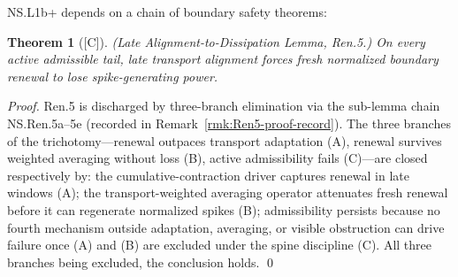 \documentclass[12pt,oneside]{amsbook}
\theoremstyle{plain}
\newtheorem{theorem}{Theorem}[section]
\theoremstyle{definition}
\theoremstyle{remark}
\newcommand{\status}[1]{\textup{[#1]}}
\begin{document}
NS.L1b+ depends on a chain of boundary safety theorems:

\begin{theorem}[\status{C}]\label{thm:NSRen5}
\textup{(Late Alignment-to-Dissipation Lemma, Ren.5.)}
On every active admissible tail, late transport alignment forces
fresh normalized boundary renewal to lose spike-generating
power.
\end{theorem}

\begin{proof}
Ren.5 is discharged by three-branch elimination via the
sub-lemma chain NS.Ren.5a--5e (recorded in
Remark~\ref{rmk:Ren5-proof-record}). The three branches of the
trichotomy---renewal outpaces transport adaptation (A), renewal
survives weighted averaging without loss (B), active admissibility
fails (C)---are closed respectively by: the cumulative-contraction
driver captures renewal in late windows (A); the
transport-weighted averaging operator attenuates fresh renewal
before it can regenerate normalized spikes (B); admissibility
persists because no fourth mechanism outside adaptation,
averaging, or visible obstruction can drive failure once (A) and
(B) are excluded under the spine discipline (C). All three
branches being excluded, the conclusion holds. \qed
\end{proof}
\end{document}
